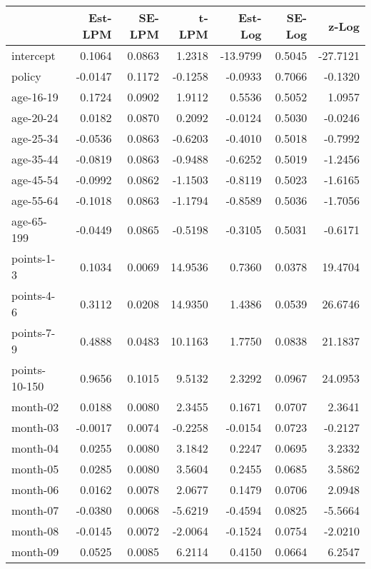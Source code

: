 \documentclass[10pt]{article}
\begin{document}
\begin{table}[ht]
\centering
\begin{tabular}{lrrrrrr}
  \hline
 & Est-LPM & SE-LPM & t-LPM & Est-Log & SE-Log & z-Log \\ 
  \hline
intercept & 0.1064 & 0.0863 & 1.2318 & -13.9799 & 0.5045 & -27.7121 \\ 
  policy & -0.0147 & 0.1172 & -0.1258 & -0.0933 & 0.7066 & -0.1320 \\ 
  age-16-19 & 0.1724 & 0.0902 & 1.9112 & 0.5536 & 0.5052 & 1.0957 \\ 
  age-20-24 & 0.0182 & 0.0870 & 0.2092 & -0.0124 & 0.5030 & -0.0246 \\ 
  age-25-34 & -0.0536 & 0.0863 & -0.6203 & -0.4010 & 0.5018 & -0.7992 \\ 
  age-35-44 & -0.0819 & 0.0863 & -0.9488 & -0.6252 & 0.5019 & -1.2456 \\ 
  age-45-54 & -0.0992 & 0.0862 & -1.1503 & -0.8119 & 0.5023 & -1.6165 \\ 
  age-55-64 & -0.1018 & 0.0863 & -1.1794 & -0.8589 & 0.5036 & -1.7056 \\ 
  age-65-199 & -0.0449 & 0.0865 & -0.5198 & -0.3105 & 0.5031 & -0.6171 \\ 
  points-1-3 & 0.1034 & 0.0069 & 14.9536 & 0.7360 & 0.0378 & 19.4704 \\ 
  points-4-6 & 0.3112 & 0.0208 & 14.9350 & 1.4386 & 0.0539 & 26.6746 \\ 
  points-7-9 & 0.4888 & 0.0483 & 10.1163 & 1.7750 & 0.0838 & 21.1837 \\ 
  points-10-150 & 0.9656 & 0.1015 & 9.5132 & 2.3292 & 0.0967 & 24.0953 \\ 
  month-02 & 0.0188 & 0.0080 & 2.3455 & 0.1671 & 0.0707 & 2.3641 \\ 
  month-03 & -0.0017 & 0.0074 & -0.2258 & -0.0154 & 0.0723 & -0.2127 \\ 
  month-04 & 0.0255 & 0.0080 & 3.1842 & 0.2247 & 0.0695 & 3.2332 \\ 
  month-05 & 0.0285 & 0.0080 & 3.5604 & 0.2455 & 0.0685 & 3.5862 \\ 
  month-06 & 0.0162 & 0.0078 & 2.0677 & 0.1479 & 0.0706 & 2.0948 \\ 
  month-07 & -0.0380 & 0.0068 & -5.6219 & -0.4594 & 0.0825 & -5.5664 \\ 
  month-08 & -0.0145 & 0.0072 & -2.0064 & -0.1524 & 0.0754 & -2.0210 \\ 
  month-09 & 0.0525 & 0.0085 & 6.2114 & 0.4150 & 0.0664 & 6.2547 \\ 

\end{tabular}
\end{table}
\end{document}
